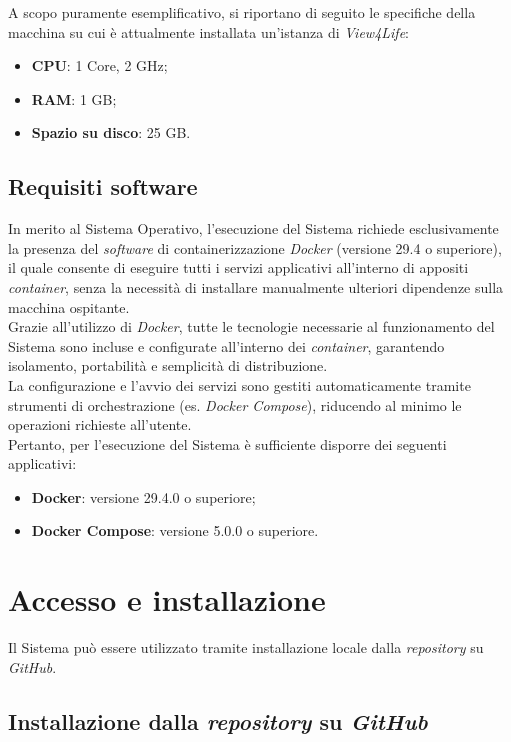 \documentclass[10pt, letterpaper]{article}
\begin{document}
A scopo puramente esemplificativo, si riportano di seguito le specifiche della macchina su cui è attualmente installata un'istanza di \textit{View4Life}: 

\begin{itemize}
    \item \textbf{CPU}: 1 Core, 2 GHz;
    \item \textbf{RAM}: 1 GB;
    \item \textbf{Spazio su disco}: 25 GB.
\end{itemize}

\subsection{Requisiti software}
In merito al Sistema Operativo, l'esecuzione del Sistema richiede esclusivamente la presenza del \textit{software} di containerizzazione \textit{Docker} (versione 29.4 o superiore), 
il quale consente di eseguire tutti i servizi applicativi all'interno di appositi \textit{container}, senza la necessità di installare manualmente ulteriori dipendenze sulla macchina ospitante.
\\Grazie all'utilizzo di \textit{Docker}, tutte le tecnologie necessarie al funzionamento del Sistema 
sono incluse e configurate all'interno dei \textit{container}, garantendo isolamento, portabilità e semplicità di distribuzione.
\\La configurazione e l'avvio dei servizi sono gestiti automaticamente tramite strumenti di orchestrazione (es. \textit{Docker Compose}), 
riducendo al minimo le operazioni richieste all'utente.
\\Pertanto, per l'esecuzione del Sistema è sufficiente disporre dei seguenti applicativi:
\begin{itemize}
    \item \textbf{Docker}: versione 29.4.0 o superiore;
    \item \textbf{Docker Compose}: versione 5.0.0 o superiore.
\end{itemize}


\section{Accesso e installazione}

Il Sistema può essere utilizzato tramite installazione locale dalla \textit{repository} su \textit{GitHub}.

\subsection{Installazione dalla \textit{repository} su \textit{GitHub}}
\label{sec:installazione-github}
\end{document}
